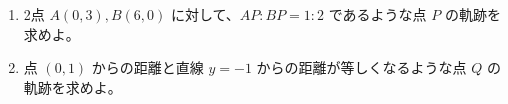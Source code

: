 \documentclass[8pt,dvipdfmx]{article}[b5paper]
\begin{document}
\begin{tcolorbox}[title=数学\textcircled{1} 5-2 AB]
\begin{enumerate}[(1)]
    \item 2点 $A(0, 3), B(6, 0)$ に対して、$AP:BP = 1:2$ であるような点 $P$ の軌跡を求めよ。
    \item 点 $(0, 1)$ からの距離と直線 $y = -1$ からの距離が等しくなるような点 $Q$ の軌跡を求めよ。
\end{enumerate}
\end{tcolorbox}
\end{document}
